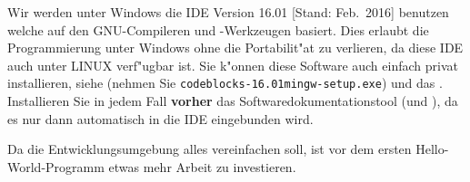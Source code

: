 Wir werden unter Windows die IDE 
Version 16.01 [Stand: Feb.~2016]
benutzen welche auf den GNU-Compileren und -Werkzeugen basiert.
Dies erlaubt die Programmierung unter Windows ohne die Portabilit"at zu verlieren, da diese IDE
auch unter LINUX verf"ugbar ist.
Sie k"onnen diese Software auch einfach privat installieren,
siehe 
(nehmen Sie \texttt{codeblocks-16.01mingw-setup.exe}) und das
.
Installieren Sie in jedem Fall \textbf{vorher} das Softwaredokumentationstool
 (und ),
da es nur dann automatisch in die IDE eingebunden wird.

Da die Entwicklungsumgebung alles vereinfachen soll, ist vor dem ersten Hello-World-Programm
etwas mehr Arbeit zu investieren.
